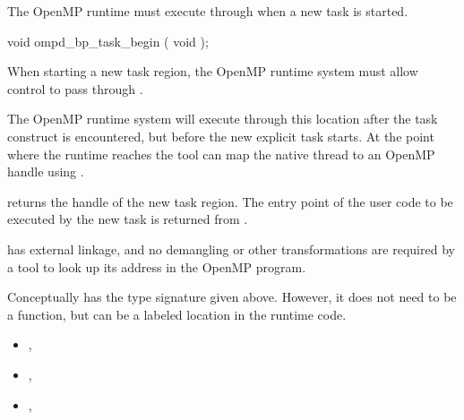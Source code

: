 \label{subsubsubsec:ompd_bp_task_begin}

The OpenMP runtime must execute through 
when a new task is started.


\begin{cspecific}
\begin{ompSyntax}
void ompd_bp_task_begin ( void );
\end{ompSyntax}
\end{cspecific}


\descr

When starting a new task region, the OpenMP runtime system
must allow control to pass through .

The OpenMP runtime system will execute through this location after the task
construct is encountered, but before the new explicit task starts.
At the point where the runtime reaches 
the tool can map the native thread to an OpenMP handle using
.

 returns the handle of the new task region.
The entry point of the user code to be executed by the new task
is returned from
.

\restrictions

 has external  linkage, and no
demangling or other transformations are required by a tool
to look up its address in the OpenMP program.

Conceptually  has the type signature
given above.
However, it does not need to be a function, but can be a labeled location
in the runtime code.

\crossreferences
\begin{itemize}
\item
  , 
\item
  , 
\item
  , 
\end{itemize}

\label{subsubsubsec:ompd_bp_task_end}


